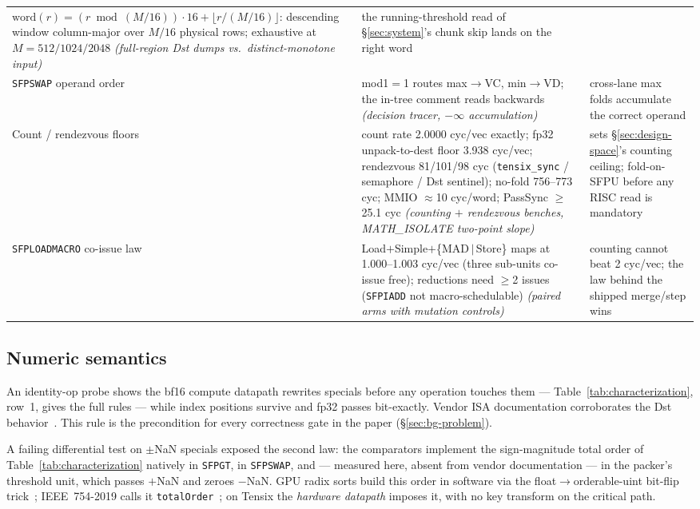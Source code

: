 \begin{table}[t]
\begin{tabular}{@{}p{2.0cm}p{9.6cm}p{5.5cm}@{}}
$\mathrm{word}(r) = (r \bmod (M/16))\cdot16 + \lfloor r/(M/16)\rfloor$:
descending window column-major over $M/16$ physical rows; exhaustive at
$M{=}512/1024/2048$ \emph{(full-region Dst dumps vs.\ distinct-monotone
input)} &
the running-threshold read of \S\ref{sec:system}'s chunk skip lands on the
right word \\
\addlinespace
\texttt{SFPSWAP} operand order &
mod1${=}$1 routes max$\rightarrow$VC, min$\rightarrow$VD; the in-tree
comment reads backwards \emph{(decision tracer, $-\infty$ accumulation)} &
cross-lane max folds accumulate the correct operand \\
\addlinespace
Count / rendezvous floors &
count rate 2.0000 cyc/vec exactly; fp32 unpack-to-dest floor 3.938 cyc/vec;
rendezvous 81/101/98 cyc (\texttt{tensix\_sync} / semaphore / Dst sentinel);
no-fold 756--773 cyc; MMIO $\approx$10 cyc/word; PassSync $\geq$25.1 cyc
\emph{(counting $+$ rendezvous benches, MATH\_ISOLATE two-point slope)} &
sets \S\ref{sec:design-space}'s counting ceiling; fold-on-SFPU before any
RISC read is mandatory \\
\addlinespace
\texttt{SFPLOADMACRO} co-issue law &
Load$+$Simple$+$\{MAD$\,|\,$Store\} maps at 1.000--1.003 cyc/vec (three
sub-units co-issue free); reductions need $\geq$2 issues
(\texttt{SFPIADD} not macro-schedulable) \emph{(paired arms with mutation
controls)} &
counting cannot beat 2 cyc/vec; the law behind the shipped merge/step wins \\
\bottomrule
\end{tabular}
\end{table}

\subsection{Numeric semantics}
\label{sec:char-numerics}

An identity-op probe shows the bf16 compute datapath rewrites specials
before any operation touches them --- Table~\ref{tab:characterization},
row~1, gives the full rules --- while index positions survive and fp32
passes bit-exactly. Vendor ISA documentation corroborates
the Dst behavior~\cite{ttisadocs2025}. This rule is the precondition for
every correctness gate in the paper (\S\ref{sec:bg-problem}).

A failing differential test on $\pm$NaN specials exposed the second law: the
comparators implement the sign-magnitude total order of
Table~\ref{tab:characterization} natively in \texttt{SFPGT}, in
\texttt{SFPSWAP}, and --- measured here, absent from vendor documentation ---
in the packer's threshold unit, which passes $+$NaN and zeroes $-$NaN. GPU
radix sorts build this order in software via the float$\to$orderable-uint
bit-flip trick~\cite{herf2001radix,merrill2011radix}; IEEE~754-2019 calls
it \texttt{totalOrder}~\cite{ieee754-2019}; on Tensix the \emph{hardware
datapath} imposes it, with no key transform on the critical path.

